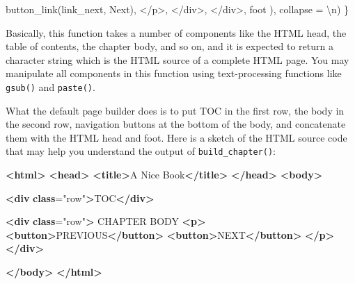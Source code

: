 \documentclass[
  12pt,
]{krantz}
\newenvironment{Shaded}{\begin{snugshade}}{\end{snugshade}}
\newcommand{\AttributeTok}[1]{\textcolor[rgb]{0.77,0.63,0.00}{#1}}
\newcommand{\ErrorTok}[1]{\textcolor[rgb]{0.64,0.00,0.00}{\textbf{#1}}}
\newcommand{\FunctionTok}[1]{\textcolor[rgb]{0.00,0.00,0.00}{#1}}
\newcommand{\KeywordTok}[1]{\textcolor[rgb]{0.13,0.29,0.53}{\textbf{#1}}}
\newcommand{\NormalTok}[1]{#1}
\newcommand{\OtherTok}[1]{\textcolor[rgb]{0.56,0.35,0.01}{#1}}
\newcommand{\SpecialCharTok}[1]{\textcolor[rgb]{0.00,0.00,0.00}{#1}}
\newcommand{\StringTok}[1]{\textcolor[rgb]{0.31,0.60,0.02}{#1}}
\theoremstyle{definition}
\theoremstyle{definition}
\theoremstyle{definition}
\theoremstyle{definition}
\theoremstyle{remark}
\begin{document}
\begin{Shaded}
\begin{Highlighting}[]
    \FunctionTok{button\_link}\NormalTok{(link\_next, }\StringTok{\textquotesingle{}Next\textquotesingle{}}\NormalTok{),}
    \StringTok{\textquotesingle{}\textless{}/p\textgreater{}\textquotesingle{}}\NormalTok{,}
    \StringTok{\textquotesingle{}\textless{}/div\textgreater{}\textquotesingle{}}\NormalTok{,}
    \StringTok{\textquotesingle{}\textless{}/div\textgreater{}\textquotesingle{}}\NormalTok{,}
\NormalTok{    foot}
\NormalTok{  ), }\AttributeTok{collapse =} \StringTok{\textquotesingle{}}\SpecialCharTok{\textbackslash{}n}\StringTok{\textquotesingle{}}\NormalTok{)}
\NormalTok{\}}
\end{Highlighting}
\end{Shaded}

Basically, this function takes a number of components like the HTML head, the table of contents, the chapter body, and so on, and it is expected to return a character string which is the HTML source of a complete HTML page. You may manipulate all components in this function using text-processing functions like \texttt{gsub()} and \texttt{paste()}.

What the default page builder does is to put TOC in the first row, the body in the second row, navigation buttons at the bottom of the body, and concatenate them with the HTML head and foot. Here is a sketch of the HTML source code that may help you understand the output of \texttt{build\_chapter()}:

\begin{Shaded}
\begin{Highlighting}[]
\KeywordTok{\textless{}html\textgreater{}}
  \KeywordTok{\textless{}head\textgreater{}}
    \KeywordTok{\textless{}title\textgreater{}}\NormalTok{A Nice Book}\KeywordTok{\textless{}/title\textgreater{}}
  \KeywordTok{\textless{}/head\textgreater{}}
  \KeywordTok{\textless{}body\textgreater{}}
  
    \KeywordTok{\textless{}div} \ErrorTok{class}\OtherTok{=}\StringTok{"row"}\KeywordTok{\textgreater{}}\NormalTok{TOC}\KeywordTok{\textless{}/div\textgreater{}}
    
    \KeywordTok{\textless{}div} \ErrorTok{class}\OtherTok{=}\StringTok{"row"}\KeywordTok{\textgreater{}}
\NormalTok{      CHAPTER BODY}
      \KeywordTok{\textless{}p\textgreater{}}
        \KeywordTok{\textless{}button\textgreater{}}\NormalTok{PREVIOUS}\KeywordTok{\textless{}/button\textgreater{}}
        \KeywordTok{\textless{}button\textgreater{}}\NormalTok{NEXT}\KeywordTok{\textless{}/button\textgreater{}}
      \KeywordTok{\textless{}/p\textgreater{}}
    \KeywordTok{\textless{}/div\textgreater{}}
  
  \KeywordTok{\textless{}/body\textgreater{}}
\KeywordTok{\textless{}/html\textgreater{}}
\end{Highlighting}
\end{Shaded}
\end{document}
